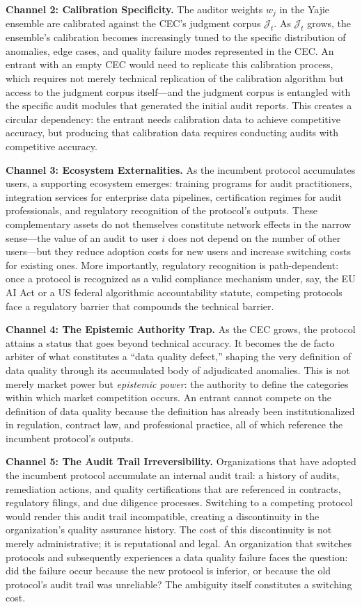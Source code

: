 \documentclass[12pt,a4paper]{article}
\theoremstyle{definition}
\theoremstyle{remark}
\begin{document}
\textbf{Channel 2: Calibration Specificity.} The auditor weights $w_j$ in the Yajie ensemble are calibrated against the CEC's judgment corpus $\mathcal{J}_t$. As $\mathcal{J}_t$ grows, the ensemble's calibration becomes increasingly tuned to the specific distribution of anomalies, edge cases, and quality failure modes represented in the CEC. An entrant with an empty CEC would need to replicate this calibration process, which requires not merely technical replication of the calibration algorithm but access to the judgment corpus itself—and the judgment corpus is entangled with the specific audit modules that generated the initial audit reports. This creates a circular dependency: the entrant needs calibration data to achieve competitive accuracy, but producing that calibration data requires conducting audits with competitive accuracy.

\textbf{Channel 3: Ecosystem Externalities.} As the incumbent protocol accumulates users, a supporting ecosystem emerges: training programs for audit practitioners, integration services for enterprise data pipelines, certification regimes for audit professionals, and regulatory recognition of the protocol's outputs. These complementary assets do not themselves constitute network effects in the narrow sense—the value of an audit to user $i$ does not depend on the number of other users—but they reduce adoption costs for new users and increase switching costs for existing ones. More importantly, regulatory recognition is path-dependent: once a protocol is recognized as a valid compliance mechanism under, say, the EU AI Act or a US federal algorithmic accountability statute, competing protocols face a regulatory barrier that compounds the technical barrier.

\textbf{Channel 4: The Epistemic Authority Trap.} As the CEC grows, the protocol attains a status that goes beyond technical accuracy. It becomes the de facto arbiter of what constitutes a ``data quality defect,'' shaping the very definition of data quality through its accumulated body of adjudicated anomalies. This is not merely market power but \textit{epistemic power}: the authority to define the categories within which market competition occurs. An entrant cannot compete on the definition of data quality because the definition has already been institutionalized in regulation, contract law, and professional practice, all of which reference the incumbent protocol's outputs.

\textbf{Channel 5: The Audit Trail Irreversibility.} Organizations that have adopted the incumbent protocol accumulate an internal audit trail: a history of audits, remediation actions, and quality certifications that are referenced in contracts, regulatory filings, and due diligence processes. Switching to a competing protocol would render this audit trail incompatible, creating a discontinuity in the organization's quality assurance history. The cost of this discontinuity is not merely administrative; it is reputational and legal. An organization that switches protocols and subsequently experiences a data quality failure faces the question: did the failure occur because the new protocol is inferior, or because the old protocol's audit trail was unreliable? The ambiguity itself constitutes a switching cost.
\end{document}
